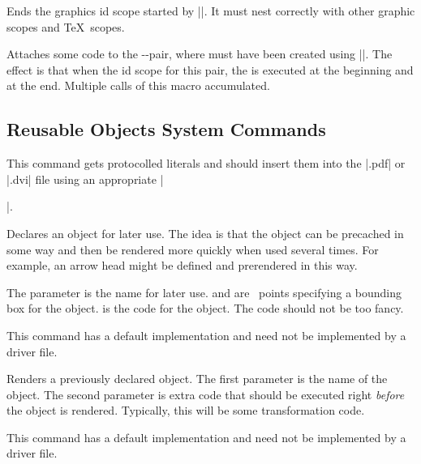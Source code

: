 \begin{command}{\pgfsys@end@idscope}
  Ends the graphics id scope started by |\pgfsys@end@idscope|. It must
  nest correctly with other graphic scopes and \TeX\ scopes.
\end{command}


\begin{command}{\pgfsys@attach@to@id{}}
  Attaches some code to the --pair, where
   must have been created using |\pgfsys@new@id|. The effect
  is that when the id scope for this pair, the  is
  executed at the beginning and  at the end. Multiple
  calls of this macro accumulated.
\end{command}


\subsection{Reusable Objects System Commands}

\begin{command}{\pgfsys@invoke{}}
  This command gets protocolled literals and should insert them into
  the |.pdf| or |.dvi| file using an appropriate |\special|.
\end{command}

\begin{command}{\pgfsys@defobject{}}
  Declares an object for later use. The idea is that the object can be
  precached in some way and then be rendered more quickly when used
  several times. For example, an arrow head might be defined and
  prerendered in this way.

  The parameter  is the name for later use.  and  are \pgfname\ points specifying a bounding
  box for the object.  is the code for the object. The code
  should not be too fancy.

  This command has a default implementation and need not be
  implemented by a driver file.
\end{command}

\begin{command}{\pgfsys@useobject{}}
  Renders a previously declared object. The first parameter is the
  name of the object. The second parameter is extra code that
  should be executed right \emph{before} the object is
  rendered. Typically, this will be some transformation code.

  This command has a default implementation and need not be
  implemented by a driver file.
\end{command}


